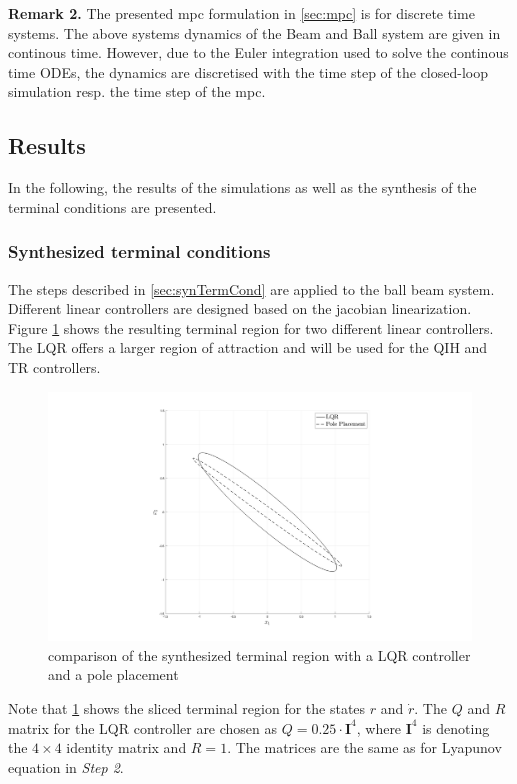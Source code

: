 \documentclass[10pt,a4paper,titlepage]{article}
\begin{document}
\textbf{Remark 2.} The presented \gls{mpc} formulation in \ref{sec:mpc} is for discrete time systems. The above systems dynamics of the Beam and Ball
system are given in continous time. However, due to the Euler integration used to solve the continous time ODEs, the dynamics are discretised with the time
step of the closed-loop simulation resp. the time step of the \gls{mpc}.


\subsection{Results}
In the following, the results of the simulations as well as the synthesis of the terminal conditions are presented.

\subsubsection*{Synthesized terminal conditions}
The steps described in \ref{sec:synTermCond} are applied to the ball beam system. Different linear controllers are designed based on the jacobian linearization.
Figure \ref{pic:LQRvsPole} shows the resulting terminal region for two different linear controllers. The LQR offers a larger region of attraction and will be used
for the QIH and TR controllers.

\begin{figure}[h]
	\begin{center}
		\includegraphics[width=\textwidth]{img/lqr_vs_pole.png}
		\caption{comparison of the synthesized terminal region with a LQR controller and a pole placement}
		\label{pic:LQRvsPole}
	\end{center}
\end{figure}

Note that \ref{pic:LQRvsPole} shows the sliced terminal region for the states $r$ and $\dot{r}$. The $Q$ and $R$ matrix for the LQR controller are chosen
as $Q = 0.25 \cdot \mathbf{I}^4$, where $\mathbf{I}^4$ is denoting the $4\times 4$ identity matrix and $R = 1$. The matrices are the same as for Lyapunov
equation in \textit{Step 2}.
\end{document}
